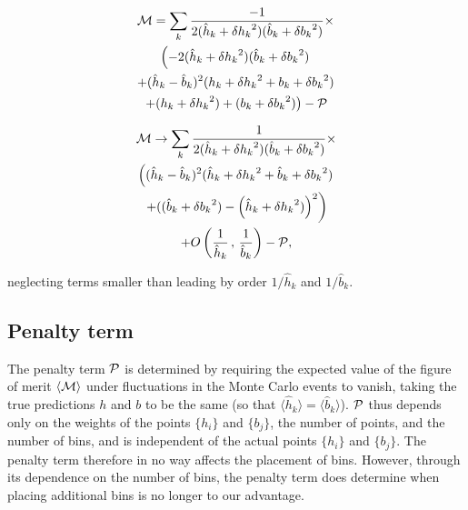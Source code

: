 \documentclass[twocolumn,twoside,prd]{revtex4} %
\newif\ifJASA \JASAfalse
\begin{document}
\begin{multline}
\label{eqn:SimplifyM5}
{\cal M} = \sum_k \frac {-1}{2 (\hat h_k+ {\delta h_k}^2)(\hat b_k + {\delta b_k}^2)} \times \\ 
\left(-2 (\hat h_k+ {\delta h_k}^2)(\hat b_k + {\delta b_k}^2) \right. \\
\left. + (\hat h_k - \hat b_k)^2 ({h_k} + {\delta h_k}^2 + {b_k} + {\delta b_k}^2) \right. \\
\left. + ({h_k} + {\delta h_k}^2) + ({b_k} + {\delta b_k}^2)\right) - {\cal P}\\
\end{multline}

\ifJASA
\begin{multline}
\label{eqn:FigureOfMeritLargeStatistics}
{\cal M} \rightarrow
\sum_k \frac{1}{ 2(\hat h_k+{\delta h_k}^2)(\hat b_k + {\delta b_k}^2) } 
  \left( (\hat h_k-\hat b_k)^2 (\hat h_k + {\delta h_k}^2 + \hat b_k + {\delta b_k}^2) \right)
 \\ \left. + ((\hat b_k+{\delta b_k}^2) - (\hat h_k+{\delta h_k}^2))^2 \right) 
+ O\left(\frac{1}{\hat h_k}\, , \, \frac{1}{\hat b_k}\right) - {\cal P},
\end{multline}
\else
\begin{multline}
\label{eqn:FigureOfMeritLargeStatistics}
{\cal M} \rightarrow
\sum_k \frac{1}{ 2(\hat h_k+{\delta h_k}^2)(\hat b_k + {\delta b_k}^2) } \times \\
  \left( (\hat h_k-\hat b_k)^2 (\hat h_k + {\delta h_k}^2 + \hat b_k + {\delta b_k}^2) \right. \\
 \left. + ((\hat b_k+{\delta b_k}^2) - \left(\hat h_k+{\delta h_k}^2)\right)^2 \right) \\
+ O\left(\frac{1}{\hat h_k}\, , \, \frac{1}{\hat b_k}\right) - {\cal P},
\end{multline}
\fi
neglecting terms smaller than leading by order $1/{\hat h_k}$ and $1/{\hat b_k}$.

\subsection{\label{sec:PenaltyTerm}Penalty term}

The penalty term ${\cal P}$ is determined by requiring the expected value of the figure of merit $\langle {\cal M} \rangle$ under fluctuations in the Monte Carlo events to vanish, taking the true predictions $h$ and $b$ to be the same (so that $\langle \hat h_k \rangle = \langle \hat b_k \rangle$).  ${\cal P}$ thus depends only on the weights of the points $\{ h_i \}$ and $\{ b_j \}$, the number of points, and the number of bins, and is independent of the actual points $\{ h_i \}$ and $\{ b_j \}$.  The penalty term therefore in no way affects the placement of bins.  However, through its dependence on the number of bins, the penalty term does determine when placing additional bins is no longer to our advantage.
\end{document}
